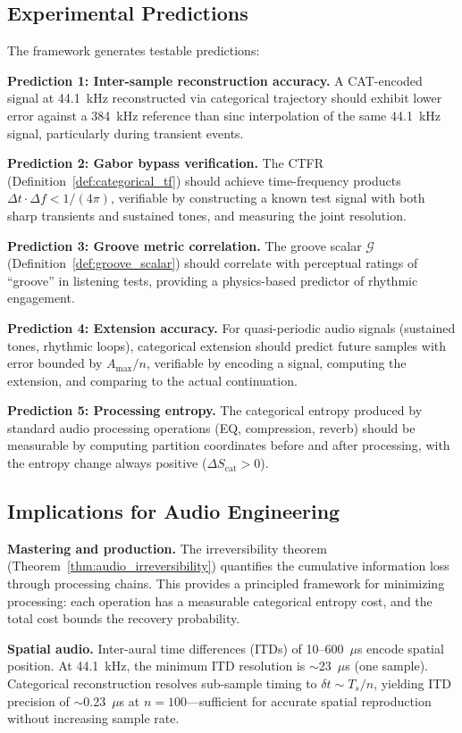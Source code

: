 \documentclass[twocolumn,10pt]{article}
\theoremstyle{remark}
\newcommand{\Scat}{S_{\mathrm{cat}}}
\newcommand{\calG}{\mathcal{G}}
\begin{document}
\subsection{Experimental Predictions}

The framework generates testable predictions:

\textbf{Prediction 1: Inter-sample reconstruction accuracy.}
A CAT-encoded signal at 44.1~kHz reconstructed via categorical trajectory should exhibit lower error against a 384~kHz reference than sinc interpolation of the same 44.1~kHz signal, particularly during transient events.

\textbf{Prediction 2: Gabor bypass verification.}
The CTFR (Definition~\ref{def:categorical_tf}) should achieve time-frequency products $\Delta t \cdot \Delta f < 1/(4\pi)$, verifiable by constructing a known test signal with both sharp transients and sustained tones, and measuring the joint resolution.

\textbf{Prediction 3: Groove metric correlation.}
The groove scalar $\calG$ (Definition~\ref{def:groove_scalar}) should correlate with perceptual ratings of ``groove'' in listening tests, providing a physics-based predictor of rhythmic engagement.

\textbf{Prediction 4: Extension accuracy.}
For quasi-periodic audio signals (sustained tones, rhythmic loops), categorical extension should predict future samples with error bounded by $A_{\max}/n$, verifiable by encoding a signal, computing the extension, and comparing to the actual continuation.

\textbf{Prediction 5: Processing entropy.}
The categorical entropy produced by standard audio processing operations (EQ, compression, reverb) should be measurable by computing partition coordinates before and after processing, with the entropy change always positive ($\Delta\Scat > 0$).

\subsection{Implications for Audio Engineering}

\textbf{Mastering and production.}
The irreversibility theorem (Theorem~\ref{thm:audio_irreversibility}) quantifies the cumulative information loss through processing chains. This provides a principled framework for minimizing processing: each operation has a measurable categorical entropy cost, and the total cost bounds the recovery probability.

\textbf{Spatial audio.}
Inter-aural time differences (ITDs) of 10--600~$\mu$s encode spatial position. At 44.1~kHz, the minimum ITD resolution is $\sim$23~$\mu$s (one sample). Categorical reconstruction resolves sub-sample timing to $\delta t \sim T_s/n$, yielding ITD precision of $\sim$0.23~$\mu$s at $n = 100$---sufficient for accurate spatial reproduction without increasing sample rate.
\end{document}
